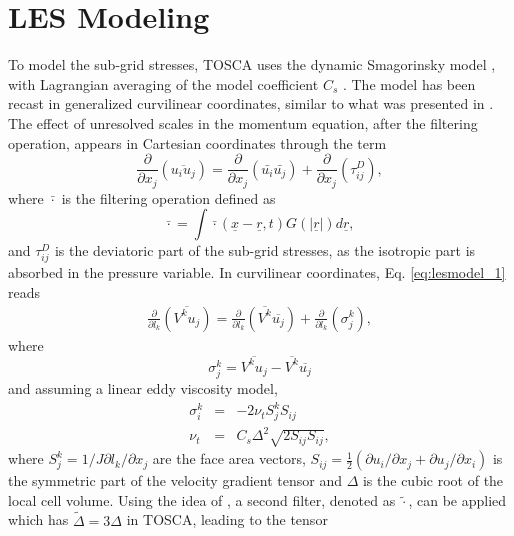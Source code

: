 \documentclass[journal abbreviation, manuscript]{copernicus}
\begin{document}
\section{LES Modeling}
\label{app:lesModeling}
To model the sub-grid stresses, TOSCA uses the dynamic Smagorinsky model \citep{1992_Lilly, 1991_GermanoEtAl}, with Lagrangian averaging of the model coefficient $C_s$ \citep{1996_MeneveauEtAl}. The model has been recast in generalized curvilinear coordinates, similar to what was presented in \cite{2000_ArmenioPiomelli}. The effect of unresolved scales in the momentum equation, after the filtering operation, appears in Cartesian coordinates through the term
\begin{equation}
	\frac{\partial}{\partial x_j}\left(\overline{u_iu_j}\right) = \frac{\partial}{\partial x_j}\left(\bar{u_i}\bar{u_j}\right) + \frac{\partial}{\partial x_j}\left(\tau_{ij}^D\right) ,\label{eq:lesmodel_1}
\end{equation}
where $\bar{\cdot}$ is the filtering operation defined as 
\begin{equation}
	\bar{\cdot} = \int\bar{\cdot}(\underline{x}-\underline{r},t)G(|\underline{r}|)d\underline{r} ,\label{eq:lesfilter}
\end{equation}
and $\tau_{ij}^D$ is the deviatoric part of the sub-grid stresses, as the isotropic part is absorbed in the pressure variable. In curvilinear coordinates, Eq. \ref{eq:lesmodel_1} reads
\begin{eqnarray}
	\frac{\partial}{\partial l_k}\left(\overline{V^ku_j}\right) = \frac{\partial}{\partial l_k}\left(\overline{V^k}\overline{u_j}\right) + \frac{\partial}{\partial l_k}\left(\sigma_j^k\right) , \label{eq:lesmodel_2}
\end{eqnarray}
where
\begin{equation}
	\sigma_j^k = \overline{V^ku_j} - \overline{V^k}\overline{u_j} 
\end{equation}
and assuming a linear eddy viscosity model,
\begin{eqnarray}
	\sigma_i^k &=& -2\nu_tS_j^kS_{ij} \label{eq:lesmodel_3} \\
	\nu_t &=& C_s\Delta^2 \sqrt{2S_{ij}S_{ij}} \label{eq:lesmodel_4},
\end{eqnarray}
where $S_j^k = 1/J \partial l_k / \partial x_j$ are the face area vectors, $S_{ij} = \frac{1}{2}(\partial u_i/\partial x_j + \partial u_j/\partial x_i)$ is the symmetric part of the velocity gradient tensor and $\Delta$ is the cubic root of the local cell volume. Using the idea of \cite{1991_GermanoEtAl}, a second filter, denoted as $\widetilde{\cdot}$, can be applied which has $\widetilde{\Delta} = 3\Delta$ in TOSCA, leading to the tensor
\end{document}
